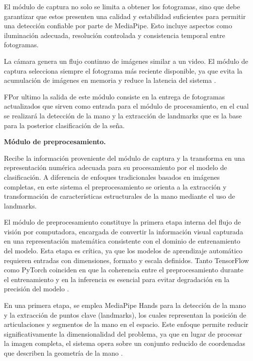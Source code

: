 	El módulo de captura no solo se limita a obtener los fotogramas, sino que debe garantizar que estos presenten una calidad y estabilidad suficientes para permitir una detección confiable por parte de MediaPipe. Esto incluye aspectos como iluminación adecuada, resolución controlada y consistencia temporal entre fotogramas.
	
	La cámara genera un flujo continuo de imágenes similar a un video. El módulo de captura selecciona siempre el fotograma más reciente disponible, ya que evita la acumulación de imágenes en memoria y reduce la latencia del sistema \cite{camerax_doc}.
	
	FPor ultimo la salida de este módulo consiste en la entrega de fotogramas actualizados que sirven como entrada para el módulo de procesamiento, en el cual se realizará la detección de la mano y la extracción de landmarks que es la base para la posterior clasificación de la seña.
	
	\textbf{Módulo de preprocesamiento.}  
	
	Recibe la información proveniente del módulo de captura y la transforma en una representación numérica adecuada para su procesamiento por el modelo de clasificación. A diferencia de enfoques tradicionales basados en imágenes completas, en este sistema el preprocesamiento se orienta a la extracción y transformación de características estructurales de la mano mediante el uso de landmarks.
	
	El módulo de preprocesamiento constituye la primera etapa interna del flujo de visión por computadora, encargada de convertir la información visual capturada en una representación matemática consistente con el dominio de entrenamiento del modelo. Esta etapa es crítica, ya que los modelos de aprendizaje automático requieren entradas con dimensiones, formato y escala definidos. Tanto TensorFlow como PyTorch coinciden en que la coherencia entre el preprocesamiento durante el entrenamiento y en la inferencia es esencial para evitar degradación en la precisión del modelo \cite{tensorflow_preprocessing,pytorch_transforms}.
	
	En una primera etapa, se emplea MediaPipe Hands para la detección de la mano y la extracción de puntos clave (landmarks), los cuales representan la posición de articulaciones y segmentos de la mano en el espacio. Este enfoque permite reducir significativamente la dimensionalidad del problema, ya que en lugar de procesar la imagen completa, el sistema opera sobre un conjunto reducido de coordenadas que describen la geometría de la mano \cite{mediapipe}.
	

